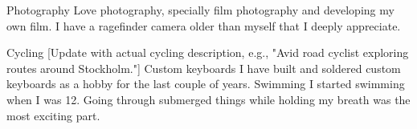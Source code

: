 



\begin{cvskills}
  \cvskill
    {Photography} %
    {Love photography, specially film photography and developing my own film. I have a ragefinder camera older than myself that I deeply appreciate.} %

  \cvskill
    {Cycling} %
    {[Update with actual cycling description, e.g., "Avid road cyclist exploring routes around Stockholm."]} %
  \cvskill
    {Custom keyboards} %
    {I have built and soldered custom keyboards as a hobby for the last couple of years.} %
  \cvskill
    {Swimming} %
    {I started swimming when I was 12. Going through submerged things while holding my breath was the most exciting part.} %

\end{cvskills}